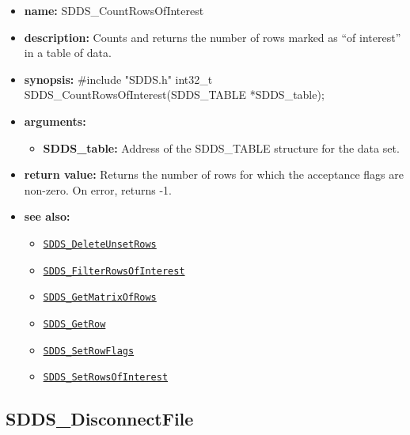 \documentclass[11pt]{article}
\newcommand{\progref}[1]{\hyperref[SDDS_#1]{\tt SDDS\_#1}}
\begin{document}
\begin{itemize}
\item {\bf name:}\newline
SDDS\_CountRowsOfInterest
\item {\bf description:}\newline
Counts and returns the number of rows marked as ``of interest'' in a table of data.
\item {\bf synopsis:} \#include "SDDS.h"\newline
int32\_t SDDS\_CountRowsOfInterest(SDDS\_TABLE *SDDS\_table);
\item {\bf arguments:}
\begin{itemize}
\item {\bf SDDS\_table:} Address of the SDDS\_TABLE structure for the data set.
\end{itemize}
\item {\bf return value:}\newline
Returns the number of rows for which the acceptance flags are non-zero. On error, returns -1.
\item {\bf see also:}
\begin{itemize}
\item \progref{DeleteUnsetRows}
\item \progref{FilterRowsOfInterest}
\item \progref{GetMatrixOfRows}
\item \progref{GetRow}
\item \progref{SetRowFlags}
\item \progref{SetRowsOfInterest}
\end{itemize}
\end{itemize}

\subsection{SDDS\_DisconnectFile}
\label{SDDS_DisconnectFile}
\end{document}
